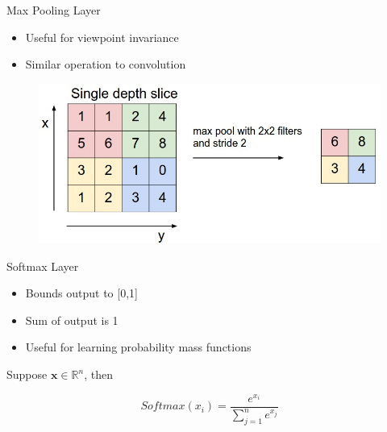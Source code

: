 \documentclass{beamer}
\begin{document}
\begin{frame}{Max Pooling Layer}
    \begin{itemize}
        \item Useful for viewpoint invariance
        \item Similar operation to convolution
    \end{itemize}


    \begin{figure}
        \includegraphics[width=\textwidth]{maxpool}
    \end{figure}
\end{frame}

\begin{frame}{Softmax Layer}
    \begin{itemize}
        \item Bounds output to [0,1]
        \item Sum of output is 1
        \item Useful for learning probability mass functions
    \end{itemize}

    Suppose $\mathbf{x} \in \mathbb{R}^n$, then 

    \[
        Softmax(x_i) = \frac{e^{x_i}}{\sum_{j=1}^{n} e^{x_j}}
    \]

\end{frame}
\end{document}
